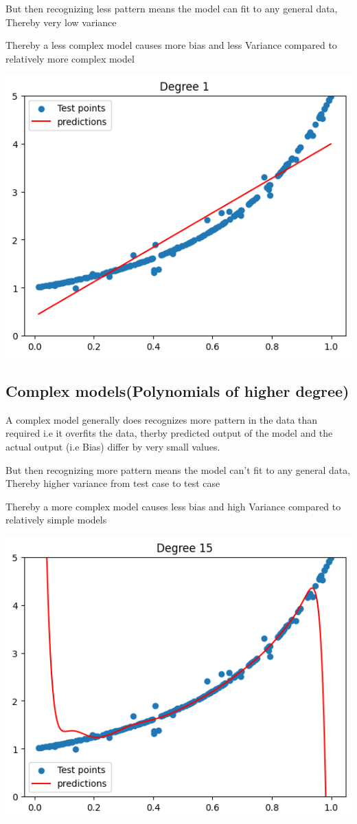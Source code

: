 \documentclass{article}
\begin{document}
But then recognizing less pattern means the model can fit to any general data, Thereby very low variance

Thereby a less complex model causes more bias and less Variance compared to relatively more complex model

\includegraphics{model-00.png}


\pagebreak
\subsection{Complex models(Polynomials of higher degree)}

A complex model generally does recognizes more pattern in the data than required i.e it overfits the data, therby predicted output of the model and the actual output (i.e Bias) differ by very small values.

But then recognizing more pattern means the model can't fit to any general data, Thereby higher variance from test case to test case

Thereby a more complex model causes less bias and high Variance compared to relatively simple models

\includegraphics{model-150.png}
\end{document}
